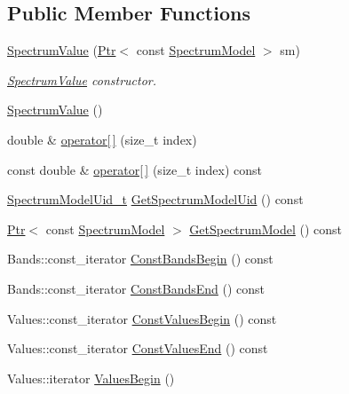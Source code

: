 \subsection*{Public Member Functions}
\begin{DoxyCompactItemize}
\item 
\hyperlink{classns3_1_1SpectrumValue_a98bc002643479772ac0a4d8ad94578e8}{Spectrum\+Value} (\hyperlink{classns3_1_1Ptr}{Ptr}$<$ const \hyperlink{classns3_1_1SpectrumModel}{Spectrum\+Model} $>$ sm)
\begin{DoxyCompactList}\small\item\em \hyperlink{classns3_1_1SpectrumValue}{Spectrum\+Value} constructor. \end{DoxyCompactList}\item 
\hyperlink{classns3_1_1SpectrumValue_a67958c08e7afd9decb2c160ee9c7f2cf}{Spectrum\+Value} ()
\item 
double \& \hyperlink{classns3_1_1SpectrumValue_a06fc99ede0b448f8dda094a5b3769bd4}{operator\mbox{[}$\,$\mbox{]}} (size\+\_\+t index)
\item 
const double \& \hyperlink{classns3_1_1SpectrumValue_aa16c66d31c1332273c62727d2ad0caf1}{operator\mbox{[}$\,$\mbox{]}} (size\+\_\+t index) const 
\item 
\hyperlink{namespacens3_a5bf0e89b3407bbb59c90a4d8c4cf0a18}{Spectrum\+Model\+Uid\+\_\+t} \hyperlink{classns3_1_1SpectrumValue_a13ebad7a54b23f2b05c01e442c1e66fd}{Get\+Spectrum\+Model\+Uid} () const 
\item 
\hyperlink{classns3_1_1Ptr}{Ptr}$<$ const \hyperlink{classns3_1_1SpectrumModel}{Spectrum\+Model} $>$ \hyperlink{classns3_1_1SpectrumValue_ade13d535ac74958581d5ad059380dc2a}{Get\+Spectrum\+Model} () const 
\item 
Bands\+::const\+\_\+iterator \hyperlink{classns3_1_1SpectrumValue_aea610473acf55a7327dfd50938c7ded4}{Const\+Bands\+Begin} () const 
\item 
Bands\+::const\+\_\+iterator \hyperlink{classns3_1_1SpectrumValue_a07f3f98e20f7a54138f7be6a307ea963}{Const\+Bands\+End} () const 
\item 
Values\+::const\+\_\+iterator \hyperlink{classns3_1_1SpectrumValue_aad6900431bd0554b3ba9a00691c2393b}{Const\+Values\+Begin} () const 
\item 
Values\+::const\+\_\+iterator \hyperlink{classns3_1_1SpectrumValue_ab5c2fbde4e06be7c0e4d7a0755c607be}{Const\+Values\+End} () const 
\item 
Values\+::iterator \hyperlink{classns3_1_1SpectrumValue_a3b1adae7ee52561bf560d7b604d9947d}{Values\+Begin} ()

\end{DoxyCompactItemize}
